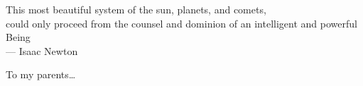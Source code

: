 \cleardoublepage
\thispagestyle{empty}


\vspace*{3cm}

\begin{raggedleft}
     This most beautiful system of the sun, planets, and comets, \\ 
     could only proceed from the counsel and dominion of an intelligent and powerful Being \\
     --- Isaac Newton\\
\end{raggedleft}

\vspace{4cm}

\begin{center}
    To my parents\dots
\end{center}


